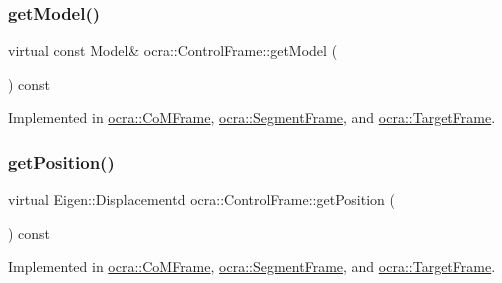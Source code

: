 \hypertarget{classocra_1_1ControlFrame_ab8a1e5e3d96d7524112b4c88bf0bc5ee}{}\label{classocra_1_1ControlFrame_ab8a1e5e3d96d7524112b4c88bf0bc5ee} 
\subsubsection{\texorpdfstring{get\+Model()}{getModel()}}
{\footnotesize\ttfamily virtual const Model\& ocra\+::\+Control\+Frame\+::get\+Model (\begin{DoxyParamCaption}{ }\end{DoxyParamCaption}) const\hspace{0.3cm}{\ttfamily [pure virtual]}}



Implemented in \hyperlink{classocra_1_1CoMFrame_afc280df9814e7eb2cf62f017f7bbfc2e}{ocra\+::\+Co\+M\+Frame}, \hyperlink{classocra_1_1SegmentFrame_a3a14b77753ad98507db9968b33c582e4}{ocra\+::\+Segment\+Frame}, and \hyperlink{classocra_1_1TargetFrame_acfd238567f0cfb9e6107cd17103ec6ea}{ocra\+::\+Target\+Frame}.

\hypertarget{classocra_1_1ControlFrame_aaadbbfbcdd5b8e197a0f181ffb2fdcbe}{}\label{classocra_1_1ControlFrame_aaadbbfbcdd5b8e197a0f181ffb2fdcbe} 
\subsubsection{\texorpdfstring{get\+Position()}{getPosition()}}
{\footnotesize\ttfamily virtual Eigen\+::\+Displacementd ocra\+::\+Control\+Frame\+::get\+Position (\begin{DoxyParamCaption}{ }\end{DoxyParamCaption}) const\hspace{0.3cm}{\ttfamily [pure virtual]}}



Implemented in \hyperlink{classocra_1_1CoMFrame_a809c05664b2e2abb489e930e27fbe2d4}{ocra\+::\+Co\+M\+Frame}, \hyperlink{classocra_1_1SegmentFrame_ad0c5aa3b15b384cd5a4774ddd534b32e}{ocra\+::\+Segment\+Frame}, and \hyperlink{classocra_1_1TargetFrame_ab2f3bd3f05be243a5d9e2123b943986d}{ocra\+::\+Target\+Frame}.

\hypertarget{classocra_1_1ControlFrame_a398df839f75886867c86a8e70ac9bf24}{}\label{classocra_1_1ControlFrame_a398df839f75886867c86a8e70ac9bf24} 
